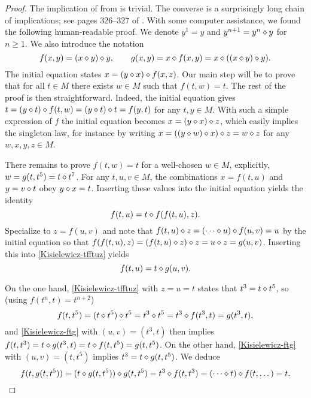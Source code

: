 \begin{proof}\leanok  The implication of  from  is trivial.  The converse is a surprisingly long chain of implications; see pages 326--327 of \cite{Kisielewicz2}.  With some computer assistance, we found the following human-readable proof.
We denote $y^1=y$ and $y^{n+1}=y^n\diamond y$ for $n\geq 1$.
We also introduce the notation
\begin{equation}
 f(x,y) = (x \diamond y) \diamond y , \qquad
 g(x,y) = x\diamond f(x,y) = x \diamond ((x \diamond y) \diamond y) .
\end{equation}
The initial equation states $x = (y \diamond x) \diamond f(x,z)$.
Our main step will be to prove that for all $t\in M$ there exists $w\in M$ such that $f(t,w) = t$.
The rest of the proof is then straightforward.
Indeed, the initial equation gives $t = (y \diamond t) \diamond f(t,w) = (y \diamond t) \diamond t = f(y,t)$ for any $t,y\in M$.
With such a simple expression of $f$ the initial equation becomes $x = (y \diamond x) \diamond z$, which easily implies the singleton law, for instance by writing $x = ((y \diamond w) \diamond x) \diamond z = w \diamond z$ for any $w,x,y,z \in M$.

There remains to prove $f(t,w) = t$ for a well-chosen $w \in M$, explicitly, $w=g(t,t^5)=t\diamond t^7$.
For any $t,u,v \in M$, the combinations $x = f(t,u)$ and $y = v \diamond t$ obey $y \diamond x = t$.  Inserting these values into the initial equation yields the identity
\begin{equation}\label{Kisielewicz-tfftuz}
f(t,u) = t \diamond f(f(t,u),z) .
\end{equation}
Specialize to $z=f(u,v)$ and note that $f(t,u) \diamond z = (\cdots \diamond u) \diamond f(u,v) = u$ by the initial equation so that $f(f(t,u),z) = (f(t,u) \diamond z) \diamond z = u \diamond z = g(u,v)$.  Inserting this into \eqref{Kisielewicz-tfftuz} yields
\begin{equation}\label{Kisielewicz-ftg}
f(t,u) = t \diamond g(u,v) .
\end{equation}

On the one hand, \eqref{Kisielewicz-tfftuz} with $z=u=t$ states that $t^3 = t \diamond t^5$, so (using $f(t^n,t)=t^{n+2}$)
\begin{equation}
  f(t,t^5) = (t \diamond t^5) \diamond t^5 = t^3 \diamond t^5 = t^3 \diamond f(t^3,t) = g(t^3,t) ,
\end{equation}
and \eqref{Kisielewicz-ftg} with $(u,v)=(t^3,t)$ then implies $f(t,t^3) = t \diamond g(t^3,t) = t \diamond f(t,t^5) = g(t,t^5)$.
On the other hand, \eqref{Kisielewicz-ftg} with $(u,v)=(t,t^5)$ implies $t^3 = t \diamond g(t,t^5)$.  We deduce
\begin{equation}
  f(t,g(t,t^5)) = (t \diamond g(t,t^5)) \diamond g(t,t^5) = t^3 \diamond f(t, t^3) = (\cdots \diamond t) \diamond f(t,\dots) = t .
\end{equation}
\end{proof}

